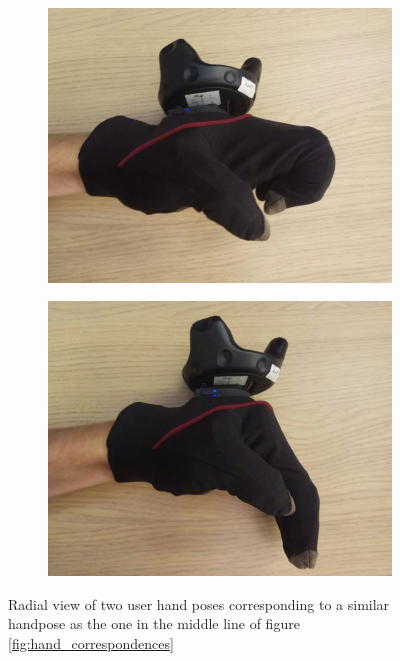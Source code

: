 \documentclass[hyperref, bachelorofscience]{cgvpub}
\begin{document}
\begin{figure}
	\begin{subfigure}{.4\linewidth}
		\includegraphics[width=\linewidth]{../pics/hand_radial_natfake1}
	\end{subfigure}
	\hfill
	\begin{subfigure}{.4\linewidth}
		\includegraphics[width=\linewidth]{../pics/hand_radial_natfake2}
	\end{subfigure}
	\caption{Radial view of two user hand poses corresponding to a similar handpose as the one in the middle line of figure \ref{fig:hand_correspondences}}
	\label{fig:natfake}
\end{figure}
\end{document}
